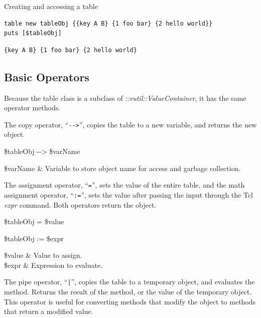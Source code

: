 \begin{example}{Creating and accessing a table}
\begin{lstlisting}
table new tableObj {{key A B} {1 foo bar} {2 hello world}}
puts [$tableObj]
\end{lstlisting}
\tcblower
\begin{lstlisting}
{key A B} {1 foo bar} {2 hello world}
\end{lstlisting}
\end{example}


\clearpage

\subsection{Basic Operators}
Because the table class is a subclass of \textit{::vutil::ValueContainer}, it has the same operator methods. 

The copy operator, ``\texttt{-{}->}'', copies the table to a new variable, and returns the new object.
\begin{syntax}
 \$tableObj -{}-> \$varName
\end{syntax} 
\begin{args}
\$varName & Variable to store object name for access and garbage collection. 
\end{args}

The assignment operator, ``\texttt{=}'', sets the value of the entire table, and the math assignment operator, ``\texttt{:=}'', sets the value after passing the input through the Tcl \textit{expr} command. 
Both operators return the object.

\begin{syntax}
 \$tableObj = \$value
\end{syntax}
\begin{syntax}
 \$tableObj := \$expr
\end{syntax}

\begin{args}
\$value & Value to assign. \\
\$expr & Expression to evaluate.
\end{args}

The pipe operator, ``\texttt{|}'', copies the table to a temporary object, and evaluates the method.
Returns the result of the method, or the value of the temporary object.
This operator is useful for converting methods that modify the object to methods that return a modified value.

